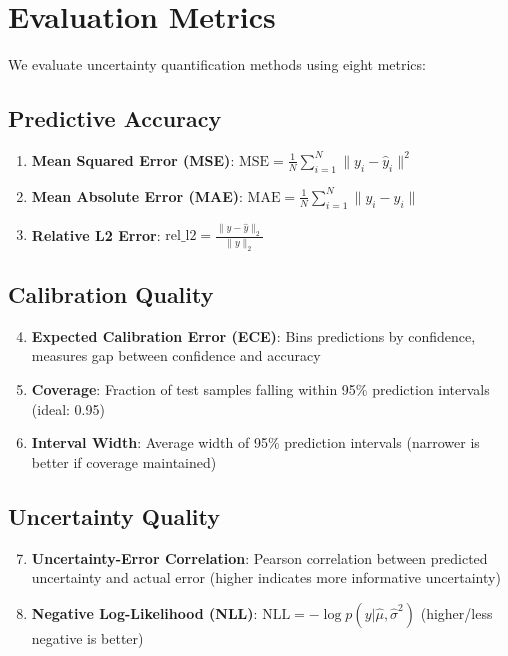 \section{Evaluation Metrics}

We evaluate uncertainty quantification methods using eight metrics:

\subsection{Predictive Accuracy}

\begin{enumerate}
\item \textbf{Mean Squared Error (MSE)}: $\text{MSE} = \frac{1}{N}\sum_{i=1}^{N} \|y_i - \hat{y}_i\|^2$

\item \textbf{Mean Absolute Error (MAE)}: $\text{MAE} = \frac{1}{N}\sum_{i=1}^{N} \|y_i - \hat{y}_i\|$

\item \textbf{Relative L2 Error}: $\text{rel\_l2} = \frac{\|y - \hat{y}\|_2}{\|y\|_2}$
\end{enumerate}

\subsection{Calibration Quality}

\begin{enumerate}
\setcounter{enumi}{3}
\item \textbf{Expected Calibration Error (ECE)}: Bins predictions by confidence, measures gap between confidence and accuracy

\item \textbf{Coverage}: Fraction of test samples falling within 95\% prediction intervals (ideal: 0.95)

\item \textbf{Interval Width}: Average width of 95\% prediction intervals (narrower is better if coverage maintained)
\end{enumerate}

\subsection{Uncertainty Quality}

\begin{enumerate}
\setcounter{enumi}{6}
\item \textbf{Uncertainty-Error Correlation}: Pearson correlation between predicted uncertainty and actual error (higher indicates more informative uncertainty)

\item \textbf{Negative Log-Likelihood (NLL)}: $\text{NLL} = -\log p(y|\hat{\mu}, \hat{\sigma}^2)$ (higher/less negative is better)
\end{enumerate}

